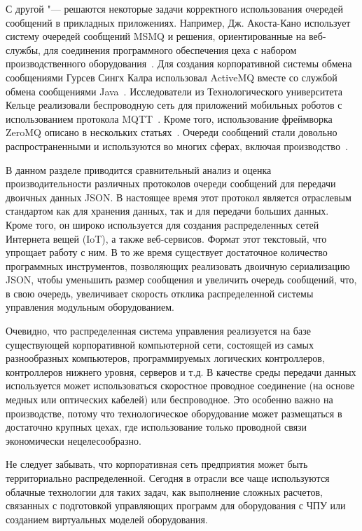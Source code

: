 С другой "--- решаются некоторые задачи корректного использования очередей сообщений в прикладных приложениях. Например, Дж. Акоста-Кано использует систему очередей сообщений MSMQ и решения, ориентированные на веб-службы, для соединения программного обеспечения цеха с набором производственного оборудования~\cite{AcostaCano2013447}. Для создания корпоративной системы обмена сообщениями Гурсев Сингх Калра использовал ActiveMQ вместе со службой обмена сообщениями Java~\cite{Kalra20147}. Исследователи из Технологического университета Кельце реализовали беспроводную сеть для приложений мобильных роботов с использованием протокола MQTT~\cite{KAZALA2015231}. Кроме того, использование фреймворка ZeroMQ описано в нескольких статьях~\cite{KIRILL2015278, GOERTZEL2014158, ANDREEV201533}. Очереди сообщений стали довольно распространенными и используются во многих сферах, включая производство~\cite{STOCK2014320, MORARIU20121850}.

В данном разделе приводится сравнительный анализ и оценка производительности различных протоколов очереди сообщений для передачи двоичных данных JSON. В настоящее время этот протокол является отраслевым стандартом как для хранения данных, так и для передачи больших данных. Кроме того, он широко используется для создания распределенных сетей Интернета вещей (IoT), а также веб-сервисов. Формат этот текстовый, что упрощает работу с ним. В то же время существует достаточное количество программных инструментов, позволяющих реализовать двоичную сериализацию JSON, чтобы уменьшить размер сообщения и увеличить очередь сообщений, что, в свою очередь, увеличивает скорость отклика распределенной системы управления модульным оборудованием.

Очевидно, что распределенная система управления реализуется на базе существующей корпоративной компьютерной сети, состоящей из самых разнообразных компьютеров, программируемых логических контроллеров, контроллеров нижнего уровня, серверов и т.д. В качестве среды передачи данных используется может использоваться скоростное проводное соединение (на основе медных или оптических кабелей) или беспроводное. Это особенно важно на производстве, потому что технологическое оборудование может размещаться в достаточно крупных цехах, где использование только проводной связи экономически нецелесообразно.

Не следует забывать, что корпоративная сеть предприятия может быть территориально распределенной. Сегодня в отрасли все чаще используются облачные технологии для таких задач, как выполнение сложных расчетов, связанных с подготовкой управляющих программ для оборудования с ЧПУ или созданием виртуальных моделей оборудования.

